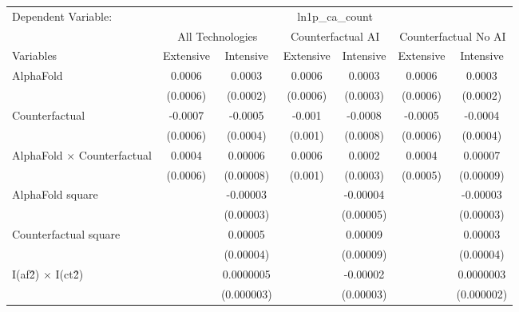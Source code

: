 \begingroup
\centering
\begin{tabular}{lcccccc}
   \tabularnewline \midrule \midrule
   Dependent Variable: & \multicolumn{6}{c}{ln1p\_ca\_count}\\
 & \multicolumn{2}{c}{All Technologies} & \multicolumn{2}{c}{Counterfactual AI} & \multicolumn{2}{c}{Counterfactual No AI} \\
\cmidrule(lr){1-1}\cmidrule(lr){2-3} \cmidrule(lr){4-5} \cmidrule(lr){6-7}
Variables & \multicolumn{1}{c}{Extensive} & \multicolumn{1}{c}{Intensive} & \multicolumn{1}{c}{Extensive} & \multicolumn{1}{c}{Intensive} & \multicolumn{1}{c}{Extensive} & \multicolumn{1}{c}{Intensive} \\
\cmidrule(lr){1-1}\cmidrule(lr){2-2} \cmidrule(lr){3-3} \cmidrule(lr){4-4} \cmidrule(lr){5-5} \cmidrule(lr){6-6} \cmidrule(lr){7-7}
   AlphaFold                          & 0.0006   & 0.0003     & 0.0006   & 0.0003    & 0.0006   & 0.0003\\   
                                      & (0.0006) & (0.0002)   & (0.0006) & (0.0003)  & (0.0006) & (0.0002)\\   
   Counterfactual                     & -0.0007  & -0.0005    & -0.001   & -0.0008   & -0.0005  & -0.0004\\   
                                      & (0.0006) & (0.0004)   & (0.001)  & (0.0008)  & (0.0006) & (0.0004)\\   
   AlphaFold $\times$ Counterfactual  & 0.0004   & 0.00006    & 0.0006   & 0.0002    & 0.0004   & 0.00007\\   
                                      & (0.0006) & (0.00008)  & (0.001)  & (0.0003)  & (0.0005) & (0.00009)\\   
   AlphaFold square                   &          & -0.00003   &          & -0.00004  &          & -0.00003\\   
                                      &          & (0.00003)  &          & (0.00005) &          & (0.00003)\\   
   Counterfactual square              &          & 0.00005    &          & 0.00009   &          & 0.00003\\   
                                      &          & (0.00004)  &          & (0.00009) &          & (0.00004)\\   
   I(af\^2) $\times$ I(ct\^2)         &          & 0.0000005  &          & -0.00002  &          & 0.0000003\\   
                                      &          & (0.000003) &          & (0.00003) &          & (0.000002)\\   

\end{tabular}
